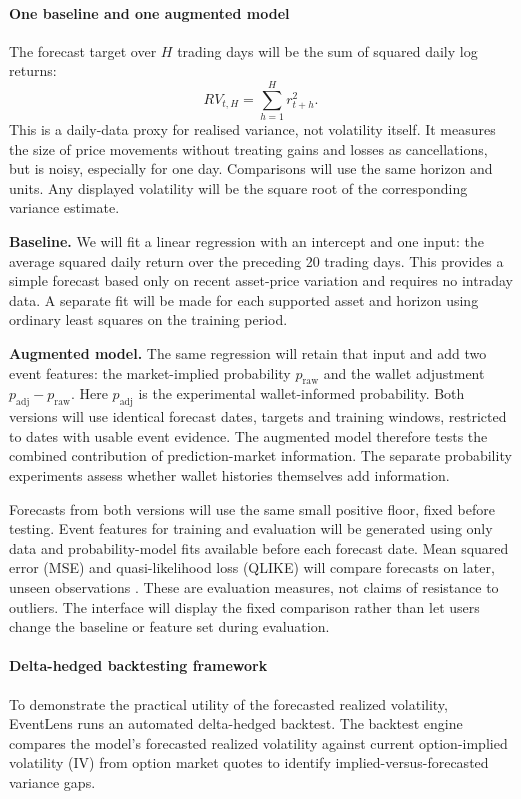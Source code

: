 \clearpage
\paragraph{One baseline and one augmented model}
The forecast target over $H$ trading days will be the sum of squared daily log returns:
\begin{equation}
RV_{t,H}=\sum_{h=1}^{H} r_{t+h}^{2}.
\end{equation}
This is a daily-data proxy for realised variance, not volatility itself. It measures the size of price movements without treating gains and losses as cancellations, but is noisy, especially for one day. Comparisons will use the same horizon and units. Any displayed volatility will be the square root of the corresponding variance estimate.

\textbf{Baseline.} We will fit a linear regression with an intercept and one input: the average squared daily return over the preceding 20 trading days. This provides a simple forecast based only on recent asset-price variation and requires no intraday data. A separate fit will be made for each supported asset and horizon using ordinary least squares on the training period.

\textbf{Augmented model.} The same regression will retain that input and add two event features: the market-implied probability $p_{\text{raw}}$ and the wallet adjustment $p_{\text{adj}}-p_{\text{raw}}$. Here $p_{\text{adj}}$ is the experimental wallet-informed probability. Both versions will use identical forecast dates, targets and training windows, restricted to dates with usable event evidence. The augmented model therefore tests the combined contribution of prediction-market information. The separate probability experiments assess whether wallet histories themselves add information.

Forecasts from both versions will use the same small positive floor, fixed before testing. Event features for training and evaluation will be generated using only data and probability-model fits available before each forecast date. Mean squared error (MSE) and quasi-likelihood loss (QLIKE) will compare forecasts on later, unseen observations \cite{patton}. These are evaluation measures, not claims of resistance to outliers. The interface will display the fixed comparison rather than let users change the baseline or feature set during evaluation.

\paragraph{Delta-hedged backtesting framework}
To demonstrate the practical utility of the forecasted realized volatility, EventLens runs an automated delta-hedged backtest. The backtest engine compares the model's forecasted realized volatility against current option-implied volatility (IV) from option market quotes to identify implied-versus-forecasted variance gaps. 

